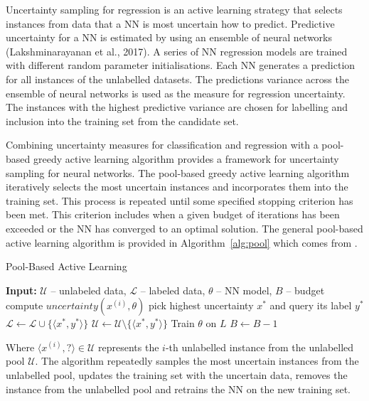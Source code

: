 \documentclass[conference]{IEEEtran}
\begin{document}
	Uncertainty sampling for regression is an active learning strategy that selects instances from data that a NN is most uncertain how to predict. Predictive uncertainty for a NN is estimated by using an ensemble of neural networks (Lakshminarayanan et al., 2017). A series of NN regression models are trained with different random parameter initialisations. Each NN generates a prediction for all instances of the unlabelled datasets. The predictions variance across the ensemble of neural networks is used as the measure for regression uncertainty. The instances with the highest predictive variance are chosen for labelling and inclusion into the training set from the candidate set.
	
	Combining uncertainty measures for classification and regression with a pool-based greedy active learning algorithm provides a framework for uncertainty sampling for neural networks. The pool-based greedy active learning algorithm iteratively selects the most uncertain instances and incorporates them into the training set. This process is repeated until some specified stopping criterion has been met. This criterion includes when a given budget of iterations has been exceeded or the NN has converged to an optimal solution. The general pool-based active learning algorithm is provided in Algorithm~\ref{alg:pool} which comes from \cite{sharma2017}.
	
	\begin{algorithm}[H]
		\caption{Pool-Based Active Learning}
		\label{alg:pool}
		\begin{algorithmic}[1]
			\State\textbf{Input:} $\mathcal{U}$ -- unlabeled data, $\mathcal{L}$ -- labeled data, $\theta$ -- NN model, $B$ -- budget
			\Repeat
			\State compute $uncertainty(x^{(i)}, \theta)$
			\EndFor
			\State pick highest uncertainty $x^{*}$ and query its label $y^{*}$
			\State $\mathcal{L} \gets \mathcal{L} \cup \{\langle x^{*}, y^{*}\rangle\}$
			\State $\mathcal{U} \gets \mathcal{U} \setminus \{\langle x^{*}, y^{*}\rangle\}$
			\State Train $\theta$ on $L$
			\State $B \gets B - 1$
		\end{algorithmic}
	\end{algorithm}
	
	Where $\langle x^{(i)}, ? \rangle \in \mathcal{U}$ represents the $i$-th unlabelled instance from the unlabelled pool $\mathcal{U}$. The algorithm repeatedly samples the most uncertain instances from the unlabelled pool, updates the training set with the uncertain data, removes the instance from the unlabelled pool and retrains the NN on the new training set.
	
\end{document}

